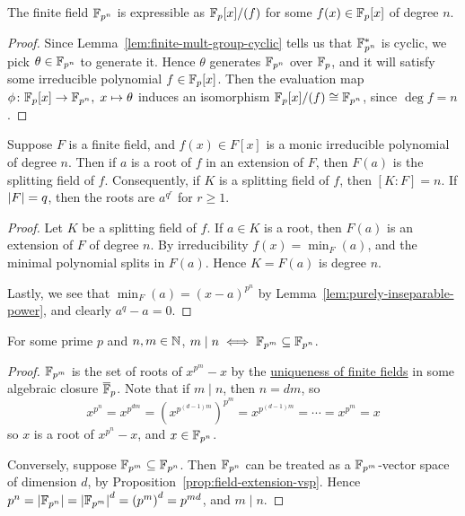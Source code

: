 \begin{lemma}\label{lem:finite-field-quotient}
    The finite field \(\mathbb{F}_{p^n}\) is expressible as \(\mathbb{F}_p[x]/(f)\)
    for some \(f(x) \in \mathbb{F}_p[x]\) of degree \(n\).
\end{lemma}
\begin{proof}
    Since Lemma~\ref{lem:finite-mult-group-cyclic}
    tells us that \(\mathbb{F}_{p^n}^\ast\) is cyclic,
    we pick \(\theta \in \mathbb{F}_{p^n}\) to generate it.
    Hence \(\theta\) generates \(\mathbb{F}_{p^n}\) over \(\mathbb{F}_p\),
    and it will satisfy some irreducible polynomial \(f \in \mathbb{F}_p[x]\).
    Then the evaluation map \(\phi\colon\mathbb{F}_p[x]\to\mathbb{F}_{p^n},\;x\mapsto\theta\)
    induces an isomorphism \(\mathbb{F}_p[x]/(f) \cong \mathbb{F}_{p^n}\),
    since \(\deg f = n\).
\end{proof}
\begin{corollary}
    Suppose \(F\) is a finite field,
    and \(f(x) \in F[x]\) is a monic irreducible polynomial of degree \(n\).
    Then if \(a\) is a root of \(f\) in an extension of \(F\),
    then \(F(a)\) is the splitting field of \(f\).
    Consequently, if \(K\) is a splitting field of \(f\),
    then \([K:F] = n\).
    If \(\abs{F} = q\), then the roots are \(a^{q^r}\) for \(r \geq 1\).
\end{corollary}
\begin{proof}
    Let \(K\) be a splitting field of \(f\).
    If \(a \in K\) is a root,
    then \(F(a)\) is an extension of \(F\) of degree \(n\).
    By irreducibility \(f(x) = \min_F(a)\),
    and the minimal polynomial splits in \(F(a)\).
    Hence \(K = F(a)\) is degree \(n\).

    Lastly, we see that \(\min_F(a) = {(x-a)}^{p^n}\)
    by Lemma~\ref{lem:purely-inseparable-power},
    and clearly \(a^q - a = 0\).
\end{proof}

\begin{proposition}
    For some prime \(p\) and \(n,m \in \mathbb{N}\),
    \(m \mid n \iff \mathbb{F}_{p^m} \subseteq \mathbb{F}_{p^n}\).
\end{proposition}
\begin{proof}
    \(\mathbb{F}_{p^m}\) is the set of roots of \(x^{p^m} - x\)
    by the \hyperref[cor:uniqueness-finite-field]{uniqueness of finite fields}
    in some algebraic closure \(\overline{\mathbb{F}}_p\).
    Note that if \(m \mid n\), then \(n = dm\), so
    \begin{equation*}
        x^{p^n} = x^{p^{dm}} = {(x^{p^{(d-1)m}})}^{p^m} = x^{p^{(d-1)m}}
        = \cdots = x^{p^m} = x
    \end{equation*}
    so \(x\) is a root of \(x^{p^n} - x\), and \(x \in \mathbb{F}_{p^n}\).

    Conversely, suppose \(\mathbb{F}_{p^m} \subseteq \mathbb{F}_{p^n}\).
    Then \(\mathbb{F}_{p^n}\) can be treated as a \(\mathbb{F}_{p^m}\)-vector space of dimension \(d\),
    by Proposition~\ref{prop:field-extension-vsp}.
    Hence \(p^n = \abs{\mathbb{F}_{p^n}} = \abs{\mathbb{F}_{p^m}}^d = {(p^m)}^d = p^{md}\),
    and \(m \mid n\).
\end{proof}

